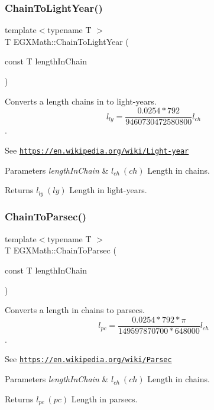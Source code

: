 \subsubsection{\texorpdfstring{Chain\+To\+Light\+Year()}{ChainToLightYear()}}
{\footnotesize\ttfamily template$<$typename T $>$ \\
T E\+G\+X\+Math\+::\+Chain\+To\+Light\+Year (\begin{DoxyParamCaption}\item[{const T}]{length\+In\+Chain }\end{DoxyParamCaption})}



Converts a length chains in to light-\/years. \[ l_{ly}=\frac{0.0254 * 792}{9460730472580800} l_{ch} \]. 

See \href{https://en.wikipedia.org/wiki/Light-year}{\tt https\+://en.\+wikipedia.\+org/wiki/\+Light-\/year} 
\begin{DoxyParams}{Parameters}
{\em length\+In\+Chain} & $ l_{ch}\ (ch)$ Length in chains. \\
\hline
\end{DoxyParams}
\begin{DoxyReturn}{Returns}
$ l_{ly}\ (ly)$ Length in light-\/years. 
\end{DoxyReturn}
\mbox{\label{group___e_g_x_math-_conversions-_length_conversions-_imperial-_chain-_astronomical_gad5475701b576e1f8609e04610024dda2}} 
\subsubsection{\texorpdfstring{Chain\+To\+Parsec()}{ChainToParsec()}}
{\footnotesize\ttfamily template$<$typename T $>$ \\
T E\+G\+X\+Math\+::\+Chain\+To\+Parsec (\begin{DoxyParamCaption}\item[{const T}]{length\+In\+Chain }\end{DoxyParamCaption})}



Converts a length in chains to parsecs. \[ l_{pc}=\frac{0.0254 * 792 * \pi}{149597870700 * 648000} l_{ch} \]. 

See \href{https://en.wikipedia.org/wiki/Parsec}{\tt https\+://en.\+wikipedia.\+org/wiki/\+Parsec} 
\begin{DoxyParams}{Parameters}
{\em length\+In\+Chain} & $ l_{ch}\ (ch)$ Length in chains. \\
\hline
\end{DoxyParams}
\begin{DoxyReturn}{Returns}
$ l_{pc}\ (pc)$ Length in parsecs. 
\end{DoxyReturn}
